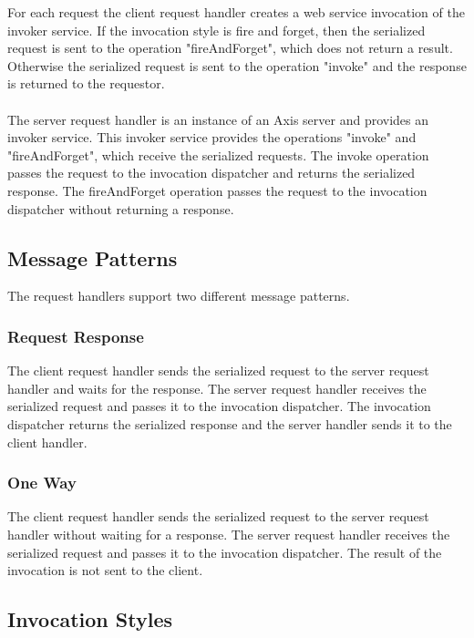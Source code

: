 For each request the client request handler creates a web service invocation of the invoker service.
If the invocation style is fire and forget, then the serialized request is sent to the operation "fireAndForget", which does not return a result.
Otherwise the serialized request is sent to the operation "invoke" and the response is returned to the requestor.\\
\\
The server request handler is an instance of an Axis server and provides an invoker service.
This invoker service provides the operations "invoke" and "fireAndForget", which receive the serialized requests.
The invoke operation passes the request to the invocation dispatcher and returns the serialized response.
The fireAndForget operation passes the request to the invocation dispatcher without returning a response. 

\subsection{Message Patterns}

The request handlers support two different message patterns.

\subsubsection{Request Response}

The client request handler sends the serialized request to the server request handler and waits for the response.
The server request handler receives the serialized request and passes it to the invocation dispatcher.
The invocation dispatcher returns the serialized response and the server handler sends it to the client handler.

\subsubsection{One Way}

The client request handler sends the serialized request to the server request handler without waiting for a response.
The server request handler receives the serialized request and passes it to the invocation dispatcher.
The result of the invocation is not sent to the client.

\subsection{Invocation Styles}

